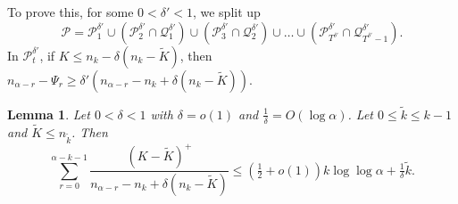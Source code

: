 \documentclass{article}
\theoremstyle{plain}
\theoremstyle{remark}
\theoremstyle{plain}
\newtheorem{lemma}[theorem]{Lemma}
\numberwithin{equation}{section}
\begin{document}
	To prove this, for some $0<\delta'<1$, we split up $$\mathcal{P}=\mathcal{P}_1^{\delta'}\cup(\mathcal{P}_2^{\delta'}\cap\mathcal{Q}_1^{\delta'})\cup(\mathcal{P}_3^{\delta'}\cap\mathcal{Q}_2^{\delta'})\cup\ldots\cup(\mathcal{P}_{T^{\delta'}}^{\delta'}\cap\mathcal{Q}_{T^{\delta'}-1}^{\delta'}).$$ In $\mathcal{P}_t^{\delta'}$, if $K\leq n_k-\delta(n_k-\widetilde{K})$, then $n_{\alpha-r}-\Psi_r\geq\delta'(n_{\alpha-r}-n_k+\delta(n_k-\widetilde{K}))$.
	
	\begin{lemma}\label{lemma_special}
		Let $0<\delta<1$ with $\delta=o(1)$ and $\tfrac1{\delta}=O(\log\alpha)$. Let $0\leq\widetilde{k}\leq k-1$ and $\widetilde{K}\leq n_{\tilde{k}}$. Then $$\sum_{r=0}^{\alpha-k-1}\frac{(K-\widetilde{K})^+}{n_{\alpha-r}-n_k+\delta(n_k-\widetilde{K})}\leq (\tfrac12+o(1))k\log\log\alpha+\tfrac1{\delta}\widetilde{k}.$$
	\end{lemma}
	
\end{document}
